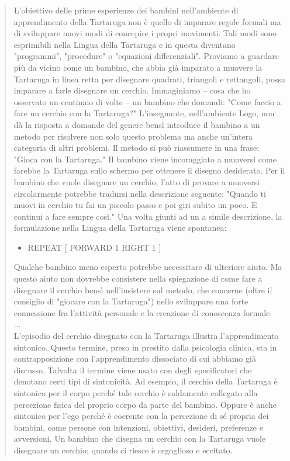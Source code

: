 \begin{quote}
L'obiettivo delle prime esperienze dei bambini nell'ambiente di apprendimento della Tartaruga non è quello di imparare regole formali ma di sviluppare nuovi modi di concepire i propri movimenti. Tali modi sono esprimibili nella Lingua della Tartaruga e in questa diventano "programmi", "procedure" o "equazioni differenziali". Proviamo a guardare più da vicino come un bambino, che abbia già imparato a muovere la Tartaruga in linea retta per disegnare quadrati, triangoli e rettangoli, possa imparare a farle disegnare un cerchio. Immaginiamo – cosa che ho osservato un centinaio di volte – un bambino che domandi: "Come faccio a fare un cerchio con la Tartaruga?" L'insegnante, nell'ambiente Logo, non dà la risposta a domande del genere bensì introduce il bambino a un metodo per risolvere non solo questo problema ma anche un'intera categoria di altri problemi. Il metodo si può riassumere in una frase: "Gioca con la Tartaruga." Il bambino viene incoraggiato a muoversi come farebbe la Tartaruga sullo schermo per ottenere il disegno desiderato. Per il bambino che vuole disegnare un cerchio, l'atto di provare a muoversi circolarmente potrebbe tradursi nella descrizione seguente: "Quando ti muovi in cerchio tu fai un piccolo passo e poi giri subito un poco. E continui a fare sempre così." Una volta giunti ad un a simile descrizione, la formulazione nella Lingua della Tartaruga viene spontanea:

\vskip 1cm

\begin{minipage}{1.0\textwidth}
\begin{itemize}[itemsep=-3pt,parsep=2pt]
\item[] \hspace{8pt}REPEAT [ FORWARD 1 RIGHT 1 ]   
\end{itemize}          	          
\end{minipage}

\vskip 1cm

Qualche bambino meno esperto potrebbe necessitare di ulteriore aiuto. Ma questo aiuto non dovrebbe consistere nella spiegazione di come fare a disegnare il cerchio bensì nell'insistere sul metodo, che concerne (oltre il consiglio di "giocare con la Tartaruga") nello sviluppare una forte connessione fra l'attività personale e la creazione di conoscenza formale. \\
... \\
L'episodio del cerchio disegnato con la Tartaruga illustra l'apprendimento sintonico. Questo termine, preso in prestito dalla psicologia clinica, sta in contrapposizione con l'apprendimento dissociato di cui abbiamo già discusso. Talvolta il termine viene usato con degli specificatori che denotano certi tipi di sintonicità. Ad esempio, il cerchio della Tartaruga è sintonico per il corpo perché tale cerchio è saldamente collegato alla percezione fisica del proprio corpo da parte del bambino. Oppure è anche sintonico per l'ego perché è coerente con la percezione di sé propria dei bambini, come persone con intenzioni, obiettivi, desideri, preferenze e avversioni. Un bambino che disegna un cerchio con la Tartaruga vuole disegnare un cerchio; quando ci riesce è orgoglioso e eccitato.


\end{quote}
